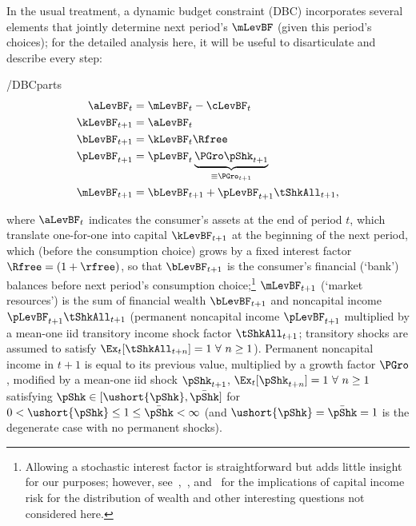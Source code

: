 \documentclass[ProjectDLO]{subfiles}
\begin{document}
In the usual treatment, a dynamic budget constraint (DBC) incorporates
several elements that jointly determine next period's $\mLevBF$ (given this
period's choices); for the detailed analysis here, it will be useful to
disarticulate and describe every step:\hypertarget{DBCParts}{}
\begin{verbatimwrite}{\EqDir/DBCparts}
  \begin{align}
    \aLevBF_{t}    & = \mLevBF_{t}-\cLevBF_{t}  \label{eq:DBCparts} \\
    \kLevBF_{t+1}   & = \aLevBF_{t} \notag \\
    \bLevBF_{t+1}    & = \kLevBF_{t} \Rfree \notag \\
    \pLevBF_{t+1}  & = \pLevBF_{t} \underbrace{\PGro\pShk_{t+1}}_{\equiv \PGro_{t+1}}  \notag \\
    \mLevBF_{t+1}  & =  \bLevBF_{t+1} +\pLevBF_{t+1}\tShkAll_{t+1},  \notag
  \end{align}
\end{verbatimwrite}

where $\aLevBF_{t}$ indicates the consumer's assets at the end of period $t$, which translate one-for-one into capital $\kLevBF_{t+1}$ at the beginning of the next period, which (before the consumption choice) grows by a fixed interest factor $\Rfree =(1+\rfree)$,  so that $\bLevBF_{t+1}$ is the consumer's financial (`bank') balances before next period's consumption choice;\footnote{Allowing a stochastic interest factor is straightforward but adds little insight for our purposes; however, see~\cite{benhabibWealth},~\cite{maTodaRich}, and~\cite{mstIncFluct} for the implications of capital income risk for the distribution of wealth and other interesting questions not considered here.} $\mLevBF_{t+1}$ (`market resources') is the sum of financial wealth $\bLevBF_{t+1}$ and noncapital income $\pLevBF_{t+1}\tShkAll_{t+1}$ (permanent noncapital income $\pLevBF_{t+1}$ multiplied by a mean-one iid transitory income shock factor $\tShkAll_{t+1}$; transitory shocks are assumed to satisfy $\Ex_{t}[{\tShkAll}_{t+n}]=1~\forall~n\geq 1$). Permanent noncapital income in $t+1$ is equal to its previous value, multiplied by a growth factor $\PGro$, modified by a mean-one iid shock $\pShk_{t+1}$, $\Ex_{t}[{\pShk}_{t+n}]=1~\forall~n \geq 1$ satisfying $\pShk \in [\ushort{\pShk},\bar{\pShk}]$ for $0 < \ushort{\pShk} \leq 1 \leq \bar{\pShk} < \infty$ (and $\ushort{\pShk}=\bar{\pShk}=1$ is the degenerate case with no permanent shocks).
\end{document}
